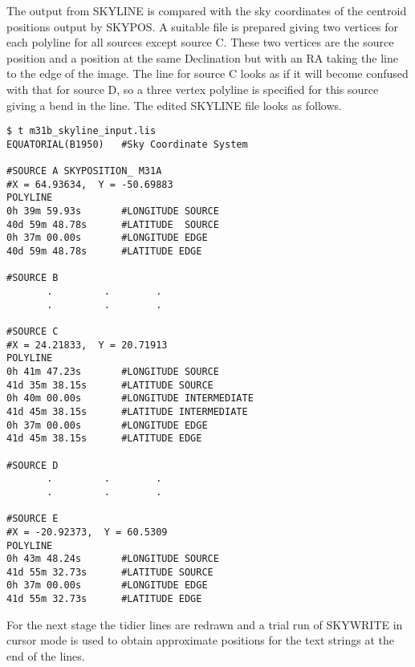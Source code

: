 The output from SKYLINE is compared with the sky coordinates of the centroid
positions output by SKYPOS. A suitable file is prepared giving two vertices
for each polyline for all sources except source C. These two vertices are the
source position and a position at the same Declination but with an RA taking
the line to the edge of the image. The line for source C looks as if it will
become confused with that for source D, so a three vertex polyline is specified
for this source giving a bend in the line. The edited SKYLINE file looks as
follows.
\begin{small}
\begin{verbatim}
$ t m31b_skyline_input.lis
EQUATORIAL(B1950)   #Sky Coordinate System

#SOURCE A SKYPOSITION_ M31A
#X = 64.93634,  Y = -50.69883
POLYLINE
0h 39m 59.93s       #LONGITUDE SOURCE
40d 59m 48.78s      #LATITUDE  SOURCE
0h 37m 00.00s       #LONGITUDE EDGE
40d 59m 48.78s      #LATITUDE EDGE

#SOURCE B
       .         .        . 
       .         .        . 
 
#SOURCE C
#X = 24.21833,  Y = 20.71913
POLYLINE
0h 41m 47.23s       #LONGITUDE SOURCE
41d 35m 38.15s      #LATITUDE SOURCE
0h 40m 00.00s       #LONGITUDE INTERMEDIATE
41d 45m 38.15s      #LATITUDE INTERMEDIATE
0h 37m 00.00s       #LONGITUDE EDGE
41d 45m 38.15s      #LATITUDE EDGE
 
#SOURCE D
       .         .        . 
       .         .        . 
 
#SOURCE E
#X = -20.92373,  Y = 60.5309
POLYLINE
0h 43m 48.24s       #LONGITUDE SOURCE
41d 55m 32.73s      #LATITUDE SOURCE
0h 37m 00.00s       #LONGITUDE EDGE
41d 55m 32.73s      #LATITUDE EDGE
\end{verbatim}
\end{small}
For the next stage the tidier lines are redrawn and a trial run of SKYWRITE in
cursor mode is used to obtain approximate positions for the text strings at the
end of the lines. 
